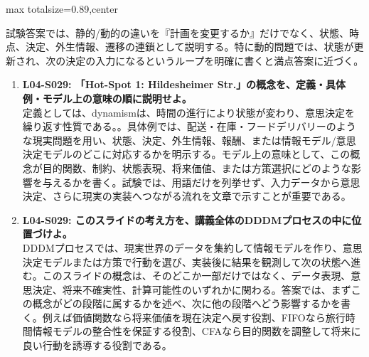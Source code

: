 \begin{minipage}[t]{0.58\textwidth}
\begin{adjustbox}{max totalsize={\textwidth}{0.89\textheight},center}
\begin{minipage}{\textwidth}
試験答案では、静的/動的の違いを『計画を変更するか』だけでなく、状態、時点、決定、外生情報、遷移の連鎖として説明する。特に動的問題では、状態が更新され、次の決定の入力になるというループを明確に書くと満点答案に近づく。\par{}\begin{enumerate}\item \textbf{L04-S029: 「Hot-Spot 1: Hildesheimer Str.」の概念を、定義・具体例・モデル上の意味の順に説明せよ。}\\定義としては、dynamismは、時間の進行により状態が変わり、意思決定を繰り返す性質である。。具体例では、配送・在庫・フードデリバリーのような現実問題を用い、状態、決定、外生情報、報酬、または情報モデル/意思決定モデルのどこに対応するかを明示する。モデル上の意味として、この概念が目的関数、制約、状態表現、将来価値、または方策選択にどのような影響を与えるかを書く。試験では、用語だけを列挙せず、入力データから意思決定、さらに現実の実装へつながる流れを文章で示すことが重要である。\item \textbf{L04-S029: このスライドの考え方を、講義全体のDDDMプロセスの中に位置づけよ。}\\DDDMプロセスでは、現実世界のデータを集約して情報モデルを作り、意思決定モデルまたは方策で行動を選び、実装後に結果を観測して次の状態へ進む。このスライドの概念は、そのどこか一部だけではなく、データ表現、意思決定、将来不確実性、計算可能性のいずれかに関わる。答案では、まずこの概念がどの段階に属するかを述べ、次に他の段階へどう影響するかを書く。例えば価値関数なら将来価値を現在決定へ戻す役割、FIFOなら旅行時間情報モデルの整合性を保証する役割、CFAなら目的関数を調整して将来に良い行動を誘導する役割である。\end{enumerate}
\end{minipage}
\end{adjustbox}
\end{minipage}


